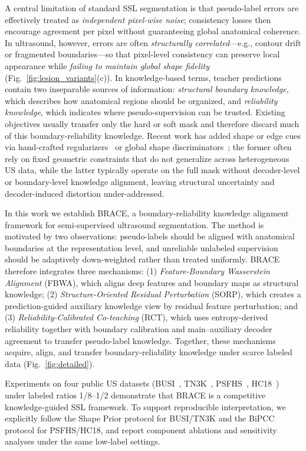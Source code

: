 \documentclass[a4paper,fleqn]{cas-dc}
\begin{document}
A central limitation of standard SSL segmentation is that pseudo-label errors are effectively treated as \emph{independent pixel-wise noise}; consistency losses then encourage agreement per pixel without guaranteeing global anatomical coherence. In ultrasound, however, errors are often \emph{structurally correlated}---e.g., contour drift or fragmented boundaries---so that pixel-level consistency can preserve local appearance while \emph{failing to maintain global shape fidelity}~\cite{b20,b38} (Fig.~\ref{fig:lesion_variants}(c)). In knowledge-based terms, teacher predictions contain two inseparable sources of information: \emph{structural boundary knowledge}, which describes how anatomical regions should be organized, and \emph{reliability knowledge}, which indicates where pseudo-supervision can be trusted. Existing objectives usually transfer only the hard or soft mask and therefore discard much of this boundary-reliability knowledge. Recent work has added shape or edge cues via hand-crafted regularizers~\cite{b56,b60,b61,b62,b63} or global shape discriminators~\cite{b2}; the former often rely on fixed geometric constraints that do not generalize across heterogeneous US data, while the latter typically operate on the full mask without decoder-level or boundary-level knowledge alignment, leaving structural uncertainty and decoder-induced distortion under-addressed.

In this work we establish BRACE, a boundary-reliability knowledge alignment framework for semi-supervised ultrasound segmentation. The method is motivated by two observations: pseudo-labels should be aligned with anatomical boundaries at the representation level, and unreliable unlabeled supervision should be adaptively down-weighted rather than treated uniformly. BRACE therefore integrates three mechanisms: (1) \emph{Feature-Boundary Wasserstein Alignment} (FBWA), which aligns deep features and boundary maps as structural knowledge; (2) \emph{Structure-Oriented Residual Perturbation} (SORP), which creates a prediction-guided auxiliary knowledge view by residual feature perturbation; and (3) \emph{Reliability-Calibrated Co-teaching} (RCT), which uses entropy-derived reliability together with boundary calibration and main--auxiliary decoder agreement to transfer pseudo-label knowledge. Together, these mechanisms acquire, align, and transfer boundary-reliability knowledge under scarce labeled data (Fig.~\ref{fig:detailed}).

Experiments on four public US datasets (BUSI~\cite{b1}, TN3K~\cite{b4}, PSFHS~\cite{b53}, HC18~\cite{b54}) under labeled ratios 1/8--1/2 demonstrate that BRACE is a competitive knowledge-guided SSL framework. To support reproducible interpretation, we explicitly follow the Shape Prior protocol for BUSI/TN3K and the BiPCC protocol for PSFHS/HC18, and report component ablations and sensitivity analyses under the same low-label settings.
\end{document}
